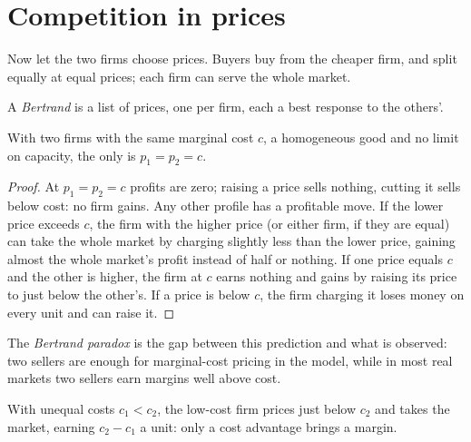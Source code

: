 \section{Competition in prices}\label{sec:b1:cournot-and-bertrand:bertrand}

Now let the two firms choose prices. Buyers buy from the cheaper firm,
and split equally at equal prices; each firm can serve the whole market.

\begin{definition}\label{def:b1:cournot-and-bertrand:bertrand}
A \emph{Bertrand } is a list of prices, one per firm, each a best
response to the others'.
\end{definition}

\begin{proposition}\label{prop:b1:cournot-and-bertrand:bertrand}
With two firms with the same marginal cost $c$, a homogeneous good and no
limit on capacity, the only  is $p_1 = p_2 = c$.
\end{proposition}

\begin{proof}
At $p_1 = p_2 = c$ profits are zero; raising a price sells nothing, cutting it
sells below cost: no firm gains. Any other profile has a profitable move.
If the lower price exceeds $c$, the firm with the higher price (or either
firm, if they are equal) can take the whole market by charging slightly
less than the lower price, gaining almost the whole market's profit instead
of half or nothing. If one price equals $c$ and the other is higher, the
firm at $c$ earns nothing and gains by raising its price to just below the
other's. If a price is below $c$, the firm charging it loses money on every
unit and can raise it.
\end{proof}

\begin{remark}
The \emph{Bertrand paradox} is the gap between this prediction and what is
observed: two sellers are enough for marginal-cost pricing in the model,
while in most real markets two sellers earn margins well above cost.
\end{remark}

With unequal costs $c_1 < c_2$, the low-cost firm prices just below $c_2$ and
takes the market, earning $c_2 - c_1$ a unit: only a cost advantage brings a
margin.

